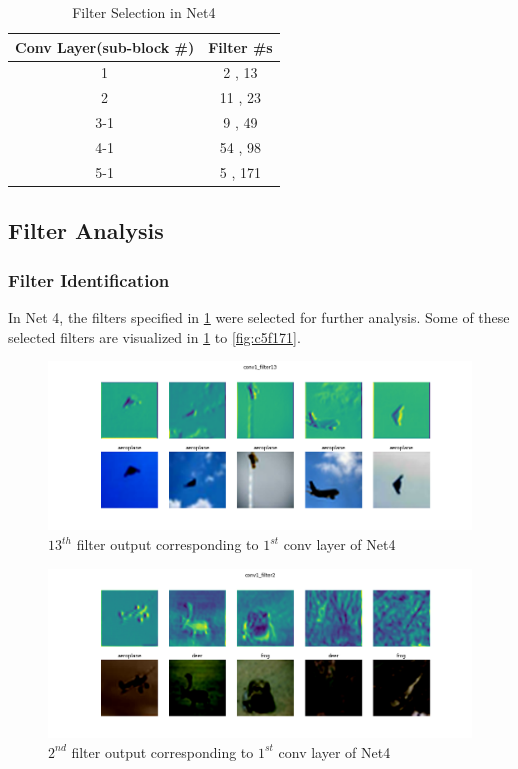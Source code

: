 \documentclass{article}
\begin{document}
\begin{table}[ht]
	\caption{Filter Selection in Net4}
	\centering
	\begin{tabular}{|c | c|}
		\hline\hline
		Conv Layer(sub-block \#) & Filter \#s \\ [0.5ex]
		\hline
		1 &   2 , 13 \\
		2 &  11 , 23 \\
		3-1 &   9 , 49 \\
		4-1 &  54 , 98 \\
		5-1 &   5 , 171\\ [1ex]
		\hline
	\end{tabular}
	\label{table:filtt}
\end{table}
\pagebreak

\subsection{Filter Analysis}
\subsubsection{Filter Identification}
In Net 4, the filters specified in \cref{table:filtt} were selected for further analysis. Some of these selected filters are visualized in \cref{fig:c1f13} to \cref{fig:c5f171}.

\begin{figure}[h!]
	\centering
	\includegraphics[scale=0.4]{../code/images/Filter_conv1_filter13.png}
	\caption{$13^{th}$ filter output corresponding to $1^{st}$ conv layer of Net4}
	\label{fig:c1f13}
\end{figure}

\begin{figure}[ht]
	\centering
	\includegraphics[scale=0.4]{../code/images/Filter_conv1_filter2.png}
	\caption{$2^{nd}$ filter output corresponding to $1^{st}$ conv layer of Net4}
	\label{fig:c1f2}
\end{figure}
\end{document}
